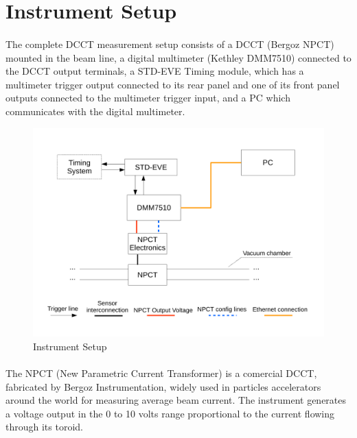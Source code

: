 \documentclass[openany]{article}
\begin{document}
\section{Instrument Setup}

	\paragraph{} The complete DCCT measurement setup consists of a DCCT (Bergoz NPCT) mounted in the beam line, a digital multimeter (Kethley DMM7510) connected to the DCCT output terminals, a STD-EVE Timing module, which has a multimeter trigger output connected to its rear panel and one of its front panel outputs connected to the multimeter trigger input, and a PC which communicates with the digital multimeter.

	\begin{figure}[!h]
	\caption{Instrument Setup}
	\label{fig:dcct-setup}
	\centering
	\includegraphics[width=1.0\textwidth]{dcct-setup-image}
	\end{figure}
\FloatBarrier

	\paragraph{} The NPCT (New Parametric Current Transformer) is a comercial DCCT, fabricated by Bergoz Instrumentation, widely used in particles accelerators around the world for measuring average beam current. The instrument generates a voltage output in the 0 to 10 volts range proportional to the current flowing through its toroid.
\end{document}

